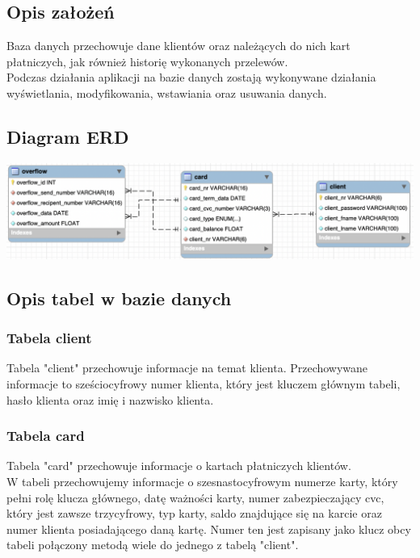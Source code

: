 \documentclass[12pt, letterpaper]{article}
\begin{document}
\subsection{Opis założeń}

\quad Baza danych przechowuje dane klientów oraz należących do nich kart płatniczych, jak również  
historię wykonanych przelewów.\\

\quad Podczas działania aplikacji na bazie danych zostają wykonywane działania wyświetlania, modyfikowania, wstawiania oraz usuwania danych.

\subsection{Diagram ERD}

\includegraphics[scale=0.5]{erd}

\subsection{Opis tabel w bazie danych}

\subsubsection{Tabela client}

\quad Tabela "client" przechowuje informacje na temat klienta. Przechowywane informacje to sześciocyfrowy numer klienta, który jest kluczem głównym tabeli, hasło klienta oraz imię i nazwisko klienta.\\


\subsubsection{Tabela card}

\quad Tabela "card" przechowuje informacje o kartach płatniczych klientów.\\ W tabeli przechowujemy informacje o szesnastocyfrowym numerze karty, który pełni rolę klucza głównego, datę ważności karty, numer zabezpieczający cvc, który jest zawsze trzycyfrowy, typ karty, saldo znajdujące się na karcie oraz numer klienta posiadającego daną kartę. Numer ten jest zapisany jako klucz obcy tabeli połączony metodą wiele do jednego z tabelą "client".
\end{document}

